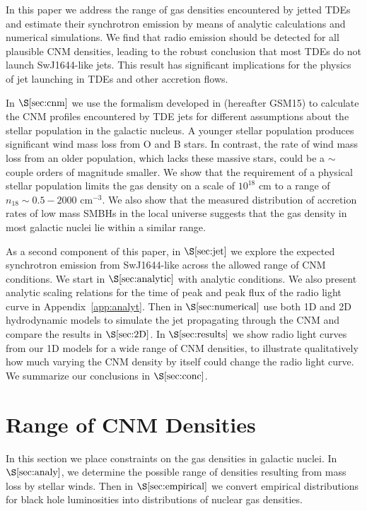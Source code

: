\documentclass[usenatbib,fleqn]{mnras}
\begin{document}
In this paper we address the range of gas densities encountered by
jetted TDEs and estimate their synchrotron emission by means of
analytic calculations and numerical simulations.  We find that radio
emission should be detected for all plausible CNM densities, leading
to the robust conclusion that most TDEs do not launch SwJ1644-like
jets.  This result has significant implications for the physics of jet
launching in TDEs and other accretion flows.

In $\S\ref{sec:cnm}$ we use the formalism developed in
\citet{Generozov+2015} (hereafter GSM15) to calculate the CNM profiles
encountered by TDE jets for different assumptions about the stellar
population in the galactic nucleus.  A younger stellar population
produces significant wind mass loss from O and B stars. In contrast,
the rate of wind mass loss from an older population, which lacks these
massive stars, could be a $\sim$couple orders of magnitude smaller.
We show that the requirement of a physical stellar population limits
the gas density on a scale of $10^{18}$ cm to a range of $n_{18} \sim
0.5-2000$ cm$^{-3}$. We also show that the measured distribution of
accretion rates of low mass SMBHs in the local universe suggests that
the gas density in most galactic nuclei lie within a similar range.

As a second component of this paper, in $\S\ref{sec:jet}$ we explore
the expected synchrotron emission from SwJ1644-like
across the allowed range of CNM conditions.  We start in
$\S\ref{sec:analytic}$ with analytic conditions. We also present
analytic scaling relations for the time of peak and peak flux of the
radio light curve in Appendix~\ref{app:analyt}.  Then in
$\S\ref{sec:numerical}$ use both 1D and 2D hydrodynamic models to
simulate the jet propagating through the CNM and compare the results
in $\S\ref{sec:2D}$. In $\S\ref{sec:results}$ we show radio light
curves from our 1D models for a wide range of CNM densities, to
illustrate qualitatively how much varying the CNM density by itself
could change the radio light curve.  We summarize our conclusions in
$\S\ref{sec:conc}$.

\section{Range of CNM Densities}
\label{sec:cnm}

In this section we place constraints on the gas densities in galactic nuclei.  In $\S\ref{sec:analy}$, we determine the
possible range of densities resulting from mass loss by stellar
winds. Then in $\S\ref{sec:empirical}$ we convert empirical
distributions for black hole luminosities into distributions of
nuclear gas densities.  
\end{document}
